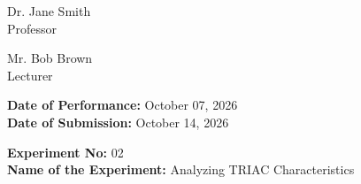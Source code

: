 \documentclass[12pt,a4paper]{article}
\begin{document}
\begin{titlepage}
\begin{minipage}[t]{0.5\textwidth}
\begin{flushright}
            Dr. Jane Smith \\
            Professor \\
            \vspace{0.3cm}
            
            Mr. Bob Brown \\
            Lecturer \\
            
            
        \end{flushright}
    \end{minipage}

    \vfill
    \textbf{Date of Performance:} October 07, 2026 \\
    \textbf{Date of Submission:} October 14, 2026
    
\end{titlepage}

\setcounter{page}{1}
\rmfamily %
\normalsize

\begin{center}
    \textbf{Experiment No:} 02 \\
    \vspace{0.2cm}
    \textbf{Name of the Experiment:} Analyzing TRIAC Characteristics
\end{center}
\vspace{0.5cm}
\end{document}
